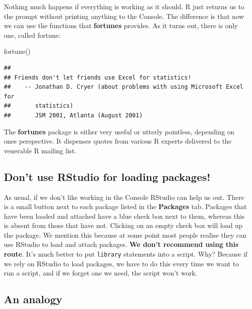 \documentclass[
]{book}
\newenvironment{Shaded}{\begin{snugshade}}{\end{snugshade}}
\newcommand{\FunctionTok}[1]{\textcolor[rgb]{0.00,0.00,0.00}{#1}}
\newcommand{\NormalTok}[1]{#1}
\newenvironment{greybox}{
  \definecolor{shadecolor}{rgb}{0.95,0.95,0.95}  %
  \color{black}
  \begin{shaded}}
 {\end{shaded}}
\newenvironment{infobox}[1]
  {
  \begin{itemize}
  \renewcommand{\labelitemi}{
    \raisebox{-.7\height}[0pt][0pt]{
      {\setkeys{Gin}{width=3em,keepaspectratio}
        \texttt{[image: images/\#1]}}
    }
  }
  \setlength{\fboxsep}{1em}
  \begin{greybox}
  \item
  }
  {
  \end{greybox}
  \end{itemize}
  }
\begin{document}
Nothing much happens if everything is working as it should. R just returns us to the prompt without printing anything to the Console. The difference is that now we can use the functions that \textbf{fortunes} provides. As it turns out, there is only one, called fortune:

\begin{Shaded}
\begin{Highlighting}[]
\FunctionTok{fortune}\NormalTok{()}
\end{Highlighting}
\end{Shaded}

\begin{verbatim}
## 
## Friends don't let friends use Excel for statistics!
##    -- Jonathan D. Cryer (about problems with using Microsoft Excel for
##       statistics)
##       JSM 2001, Atlanta (August 2001)
\end{verbatim}

The \textbf{fortunes} package is either very useful or utterly pointless, depending on ones perspective. It dispenses quotes from various R experts delivered to the venerable R mailing list.

\begin{infobox}{warning}

\hypertarget{dont-use-rstudio-for-loading-packages}{%
\subsection{Don't use RStudio for loading packages!}\label{dont-use-rstudio-for-loading-packages}}

As usual, if we don't like working in the Console RStudio can help us out. There is a small button next to each package listed in the \textbf{Packages} tab. Packages that have been loaded and attached have a blue check box next to them, whereas this is absent from those that have not. Clicking on an empty check box will load up the package. We mention this because at some point most people realise they can use RStudio to load and attach packages. \textbf{We don't recommend using this route}. It's much better to put \texttt{library} statements into a script. Why? Because if we rely on RStudio to load packages, we have to do this every time we want to run a script, and if we forget one we need, the script won't work.

\end{infobox}

\hypertarget{an-analogy}{%
\subsection{An analogy}\label{an-analogy}}
\end{document}
